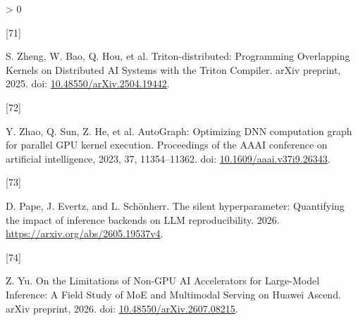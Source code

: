 \documentclass[UTF8,10.5pt,fontset=windows]{ctexart}
\newlength{\cslhangindent}
\newlength{\csllabelwidth}
\newenvironment{CSLReferences}[2] %
 {%
  \setlength{\parindent}{0pt}
  \ifodd #1 \everypar{\setlength{\hangindent}{\cslhangindent}}\ignorespaces\fi
  \ifnum #2 > 0
  \setlength{\parskip}{#2\baselineskip}
  \fi
 }%
 {}
\newcommand{\CSLLeftMargin}[1]{\parbox[t]{\csllabelwidth}{#1}}
\newcommand{\CSLRightInline}[1]{\parbox[t]{\linewidth - \csllabelwidth}{#1}\break}
\begin{document}
\begin{CSLReferences}{0}{0}
\leavevmode{}%
\CSLLeftMargin{{[}71{]} }
\CSLRightInline{S. Zheng, W. Bao, Q. Hou, et al. {Triton-distributed:
Programming Overlapping Kernels on Distributed AI Systems with the
Triton Compiler}. arXiv preprint, 2025. doi:
\href{https://doi.org/10.48550/arXiv.2504.19442}{10.48550/arXiv.2504.19442}.}

\leavevmode{}%
\CSLLeftMargin{{[}72{]} }
\CSLRightInline{Y. Zhao, Q. Sun, Z. He, et al. AutoGraph: Optimizing DNN
computation graph for parallel GPU kernel execution. Proceedings of the
AAAI conference on artificial intelligence, 2023, 37, 11354--11362. doi:
\href{https://doi.org/10.1609/aaai.v37i9.26343}{10.1609/aaai.v37i9.26343}.}

\leavevmode{}%
\CSLLeftMargin{{[}73{]} }
\CSLRightInline{D. Pape, J. Evertz, and L. Schönherr. The silent
hyperparameter: Quantifying the impact of inference backends on LLM
reproducibility. 2026. \url{https://arxiv.org/abs/2605.19537v4}.}

\leavevmode{}%
\CSLLeftMargin{{[}74{]} }
\CSLRightInline{Z. Yu. {On the Limitations of Non-GPU AI Accelerators
for Large-Model Inference: A Field Study of MoE and Multimodal Serving
on Huawei Ascend}. arXiv preprint, 2026. doi:
\href{https://doi.org/10.48550/arXiv.2607.08215}{10.48550/arXiv.2607.08215}.}

\end{CSLReferences}
\end{document}
